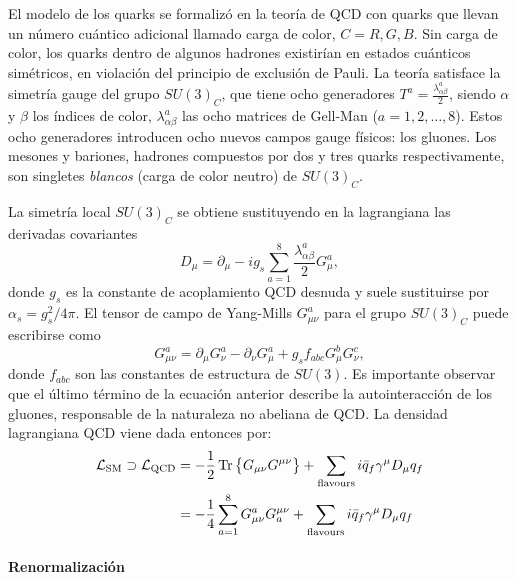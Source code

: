El modelo de los quarks se formalizó en la teoría de \ac{QCD} con quarks que llevan un número cuántico adicional llamado carga de color, \(C=R,G,B\). Sin carga de color, los quarks dentro de algunos hadrones existir\'ian en estados cuánticos simétricos, en violación del principio de exclusión de Pauli.
La teoría satisface la simetría gauge del grupo \(SU(3)_C\), que tiene ocho generadores \(T^a = \frac{\lambda_{\alpha\beta}^a}{2}\), siendo \(\alpha\) y \(\beta\) los índices de color, \(\lambda_{\alpha\beta}^a\) las ocho matrices de Gell-Man (\(a=1,2,\dots,8\)). Estos ocho generadores introducen ocho nuevos campos gauge físicos: los gluones.
Los mesones y bariones, hadrones compuestos por dos y tres quarks respectivamente, son singletes \textit{blancos} (carga de color neutro) de \(SU(3)_C\).

La simetría local \(SU(3)_C\) se obtiene sustituyendo en la lagrangiana las derivadas covariantes
\begin{equation*}
    D_{\mu} = \partial_{\mu} - i g_s \sum_{a=1}^{8} \frac{\lambda_{\alpha\beta}^a}{2} G_{\mu}^a,
\end{equation*}
donde \(g_s\) es la constante de acoplamiento \ac{QCD} desnuda y suele sustituirse por \(\alpha_s = g_s^2 / 4\pi\). El tensor de campo de Yang-Mills \(G_{\mu\nu}^a\) para el grupo \(SU(3)_C\) puede escribirse como
\begin{equation*}
    G_{\mu\nu}^a = \partial_{\mu} G_{\nu}^a - \partial_{\nu} G_{\mu}^a + g_s f_{abc} G_{\mu}^b G_{\nu}^c,
\end{equation*}
donde \(f_{abc}\) son las constantes de estructura de \(SU(3)\). Es importante observar que el último término de la ecuación anterior describe la autointeracción de los gluones, responsable de la naturaleza no abeliana de \ac{QCD}.
La densidad lagrangiana \ac{QCD} viene dada entonces por:
\begin{align*}
    \mathcal{L}_{\text{SM}} \supset \mathcal{L}_{\text{QCD}}
    &=
        -\frac{1}{2} \Tr\left\{G_{\mu\nu}G^{\mu\nu}\right\}
        + 
        \sum_{\text{flavours}} i \bar{q}_f \gamma^{\mu} D_{\mu} q_f\\
    &=
        -\frac{1}{4} \sum_{a=1}^{8} G_{\mu\nu}^a G^{\mu\nu}_a
        + 
        \sum_{\text{flavours}} i \bar{q}_f \gamma^{\mu} D_{\mu} q_f
\end{align*}

\paragraph{Renormalizaci\'on}

